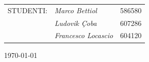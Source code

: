 \begin{titlepage}
    \begin{flushright}\vskip2.0cm 
    \begin{tabular}{rll}
	   \rm\large \uppercase{Studenti:}
	   &\emph{Marco Bettiol} &586580\\
	   & \emph{Ludovik \c{C}oba} &607286\\
	   & \emph{Francesco Locascio} &604120\\
		\end{tabular}
		\end{flushright}
    \vfill\begin{center}\today \end{center}
    
\end{titlepage}

\newpage


